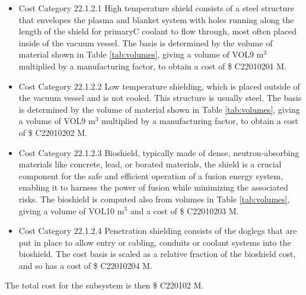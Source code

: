 \begin{itemize}
    \item Cost Category 22.1.2.1 High temperature shield consists of a steel structure that envelopes the plasma and blanket system with holes running along the length of the shield for primaryC coolant to flow through, most often placed inside of the vacuum vessel. The basis is determined by the volume of material shown in Table \ref{tab:volumes}, giving a volume of VOL9  m$^{3}$ multiplied by a manufacturing factor, to obtain a cost of \$ C22010201 M. %
    \item Cost Category 22.1.2.2 Low temperature shielding, which is placed outside of the vacuum vessel and is not cooled.  This structure is usually steel.  The basis is determined by the volume of material shown in Table \ref{tab:volumes}, giving a volume of VOL9  m$^{3}$ multiplied by a manufacturing factor, to obtain a cost of \$ C22010202 M.
    \item Cost Category 22.1.2.3 Bioshield, typically made of dense, neutron-absorbing materials like concrete, lead, or borated materials, the shield is a crucial component for the safe and efficient operation of a fusion energy system, enabling it to harness the power of fusion while minimizing the associated risks.  The bioshield is computed also from volumes in Table \ref{tab:volumes}, giving a volume of VOL10 m$^{3}$ and a cost of \$ C22010203 M. 
    \item Cost Category 22.1.2.4 Penetration shielding consists of the doglegs that are put in place to allow entry or cabling, conduits or coolant systems into the bioshield.  The cost basis is scaled as a relative fraction of the bioshield cost, and so has a cost of \$ C22010204 M.
\end{itemize}

The total cost for the subsystem is then \$ C220102 M.




